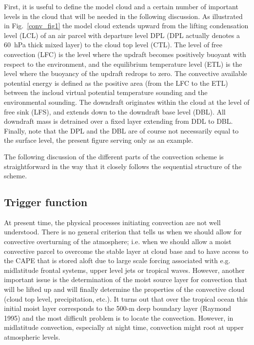 First, it is useful to define the
model cloud and a certain number
of important levels in the cloud that will be needed in the
following discussion. As illustrated in Fig.~\ref{conv_fig1}
the model cloud extends upward from the lifting condensation level (LCL) of
an air parcel with departure level DPL (DPL actually denotes a
60~hPa thick mixed layer) to
the cloud top level (CTL).
 The level of free convection (LFC)
is the level where the updraft becomes positively buoyant with respect
to the environment,
and the equilibrium temperature level (ETL) is
the level where the buoyancy of the updraft redrops to zero.
The convective available potential energy is defined as the positive area
(from the LFC to the ETL) between
the incloud virtual potential temperature sounding and the environmental
sounding.  The downdraft
originates within the cloud at the level of free sink (LFS), and extends down
to the downdraft base level (DBL). All downdraft mass is detrained over
a fixed layer extending from DDL to DBL.
Finally, note that the DPL and the DBL are
of course not necessarily equal to the surface level, the present figure serving
only as an example.


The following discussion of the different parts of the convection
scheme is straightforward in the way that it closely follows the sequential
structure of the scheme.



\subsection{Trigger function}

At present time, the physical processes initiating convection
are not well understood. There is no general criterion that tells
us when we should allow for convective overturning of the atmosphere; i.e.
when we should allow a moist convective parcel to overcome the stable
layer at cloud base and to have access to the CAPE that is stored aloft
due to large scale forcing associated with
e.g. midlatitude frontal systems, upper level jets or tropical waves.
However, another important
issue is the determination of the moist source layer for convection that
will be lifted up and will finally determine the properties of the
convective cloud (cloud top level, precipitation, etc.).
It turns out that over the tropical ocean this initial
moist layer corresponds to the 500-m deep boundary layer (Raymond 1995)
and the most difficult
problem is to locate the convection. However, in midlatitude convection,
especially at night time, convection might root at upper
atmospheric levels.

